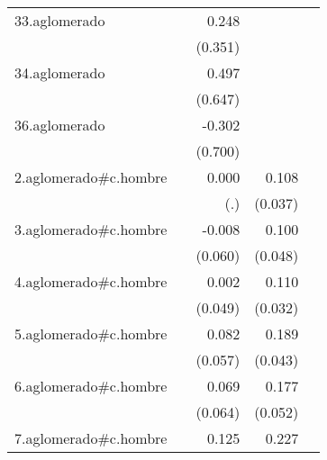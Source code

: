 {\begin{longtable}{l*{4}{D{.}{.}{-1}}}
\addlinespace
33.aglomerado&                     &       0.248         &                     &                     \\
            &                     &     (0.351)         &                     &                     \\
\addlinespace
34.aglomerado&                     &       0.497         &                     &                     \\
            &                     &     (0.647)         &                     &                     \\
\addlinespace
36.aglomerado&                     &      -0.302         &                     &                     \\
            &                     &     (0.700)         &                     &                     \\
\addlinespace
2.aglomerado#c.hombre&                     &       0.000         &       0.108\sym{**} &                     \\
            &                     &         (.)         &     (0.037)         &                     \\
\addlinespace
3.aglomerado#c.hombre&                     &      -0.008         &       0.100\sym{*}  &                     \\
            &                     &     (0.060)         &     (0.048)         &                     \\
\addlinespace
4.aglomerado#c.hombre&                     &       0.002         &       0.110\sym{***}&                     \\
            &                     &     (0.049)         &     (0.032)         &                     \\
\addlinespace
5.aglomerado#c.hombre&                     &       0.082         &       0.189\sym{***}&                     \\
            &                     &     (0.057)         &     (0.043)         &                     \\
\addlinespace
6.aglomerado#c.hombre&                     &       0.069         &       0.177\sym{***}&                     \\
            &                     &     (0.064)         &     (0.052)         &                     \\
\addlinespace
7.aglomerado#c.hombre&                     &       0.125\sym{*}  &       0.227\sym{***}&                     \\

\end{longtable}}
